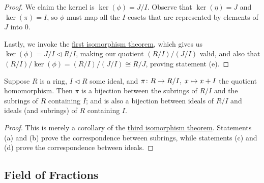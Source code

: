\begin{proof}
    We claim the kernel is \(\ker(\phi) = J/I\).
    Observe that \(\ker(\eta) = J\) and \(\ker(\pi) = I\),
    so \(\phi\) must map all the \(I\)-cosets
    that are represented by elements of \(J\) into \(0\).

    Lastly, we invoke the \hyperref[thm:iso-1-ring]{first isomorphism theorem},
    which gives us \(\ker(\phi) = J/I \lhd R/I\),
    making our quotient \((R/I)/(J/I)\) valid,
    and also that \((R/I)/\ker(\phi) = (R/I)/(J/I) \cong R/J\),
    proving statement (e).
\end{proof}

\begin{theorem}\label{thm:iso-4-ring}
    Suppose \(R\) is a ring, \(I \lhd R\) some ideal,
    and \(\pi\colon R\to R/I,\;x\mapsto x+I\) the quotient homomorphism.
    Then \(\pi\) is a bijection between the subrings of \(R/I\)
    and the subrings of \(R\) containing \(I\);
    and is also a bijection between ideals of \(R/I\)
    and ideals (and subrings) of \(R\) containing \(I\).
\end{theorem}
\begin{proof}
    This is merely a corollary of
    the \hyperref[thm:iso-3-ring]{third isomorphism theorem}.
    Statements (a) and (b) prove the correspondence between subrings,
    while statements (c) and (d) prove the correspondence between ideals.
\end{proof}


\subsection{Field of Fractions}


